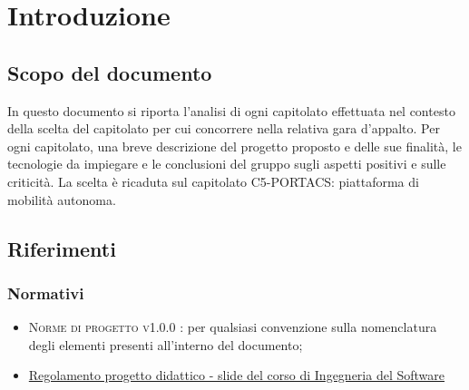 \section{Introduzione}
\subsection{Scopo del documento}
In questo documento si riporta l'analisi di ogni capitolato effettuata nel contesto della scelta del capitolato per cui concorrere nella relativa gara d'appalto. Per ogni capitolato, una breve descrizione del progetto proposto e delle sue finalità, le tecnologie da impiegare e le conclusioni del gruppo sugli aspetti positivi e sulle criticità. La scelta è ricaduta sul capitolato C5-PORTACS: piattaforma di mobilità autonoma.


\subsection{Riferimenti}

\subsubsection{Normativi}

\begin{itemize}
	\item \textsc{Norme di progetto v1.0.0 }: per qualsiasi convenzione sulla nomenclatura degli elementi presenti all'interno del documento;
	\item \href{https://www.math.unipd.it/~tullio/IS-1/2020/Dispense/P1.pdf}{Regolamento progetto didattico - slide del corso di Ingegneria del Software} \newline 
\end{itemize}

